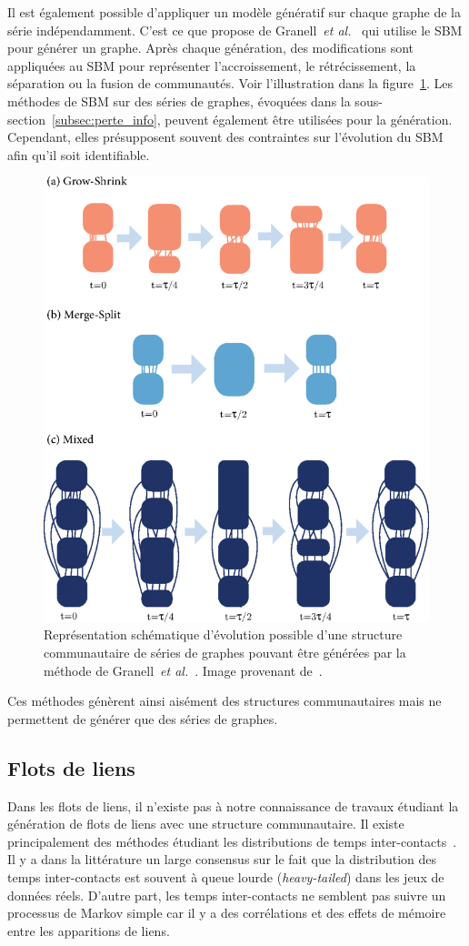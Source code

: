 Il est également possible d'appliquer un modèle génératif sur chaque graphe de la série indépendamment.
C'est ce que propose de Granell~\emph{et al.}~\cite{Granell2015a} qui utilise le SBM pour générer un graphe.
Après chaque génération, des modifications sont appliquées au SBM pour représenter l'accroissement, le rétrécissement, la séparation ou la fusion de communautés.
Voir l'illustration dans la figure~\ref{fig:qualite_Grannell}.
Les méthodes de SBM sur des séries de graphes, évoquées dans la sous-section~\ref{subsec:perte_info}, peuvent également être utilisées pour la génération.
Cependant, elles présupposent souvent des contraintes sur l'évolution du SBM afin qu'il soit identifiable.

\begin{figure}
\centering
\includegraphics[width=0.4\linewidth]{img/Qualite/Granell.png}
\caption{Représentation schématique d'évolution possible d'une structure communautaire de séries de graphes pouvant être générées par la méthode de Granell~\emph{et al.}~\cite{Granell2015a}. Image provenant de~\cite{Granell2015a}.}
\label{fig:qualite_Grannell}
\end{figure}

Ces méthodes génèrent ainsi aisément des structures communautaires mais ne permettent de générer que des séries de graphes.

\subsection{Flots de liens}

Dans les flots de liens, il n'existe pas à notre connaissance de travaux étudiant la génération de flots de liens avec une structure communautaire.
Il existe principalement des méthodes étudiant les distributions de temps inter-contacts~\cite{Malmgren2008,Malmgren2009,Vestergaard2014}.
Il y a dans la littérature un large consensus sur le fait que la distribution des temps inter-contacts est souvent à queue lourde (\emph{heavy-tailed}) dans les jeux de données réels\cite{Karsai2011,Karsai2012a,Kivela2015}.
D'autre part, les temps inter-contacts ne semblent pas suivre un processus de Markov simple car il y a des corrélations et des effets de mémoire entre les apparitions de liens.

